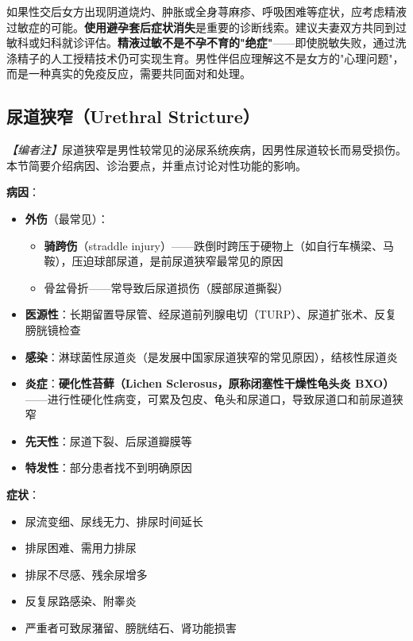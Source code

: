 \begin{enumerate}
\begin{tcolorbox}[colback=pink!5!white,colframe=red!50!black,title=贴心小叮咛]
如果性交后女方出现阴道烧灼、肿胀或全身荨麻疹、呼吸困难等症状，应考虑精液过敏症的可能。\textbf{使用避孕套后症状消失}是重要的诊断线索。建议夫妻双方共同到过敏科或妇科就诊评估。\textbf{精液过敏不是不孕不育的"绝症"}——即使脱敏失败，通过洗涤精子的人工授精技术仍可实现生育。男性伴侣应理解这不是女方的"心理问题"，而是一种真实的免疫反应，需要共同面对和处理。
\end{tcolorbox}

\subsection{尿道狭窄（Urethral Stricture）}
\label{subsec:urethral_stricture}

\noindent\textit{【编者注】}尿道狭窄是男性较常见的泌尿系统疾病，因男性尿道较长而易受损伤。本节简要介绍病因、诊治要点，并重点讨论对性功能的影响。

\vspace{0.5em}
\noindent\textbf{病因}：

\begin{itemize}[leftmargin=2cm]
	\item \textbf{外伤}（最常见）：
	\begin{itemize}
		\item \textbf{骑跨伤}（straddle injury）——跌倒时跨压于硬物上（如自行车横梁、马鞍），压迫球部尿道，是前尿道狭窄最常见的原因
		\item 骨盆骨折——常导致后尿道损伤（膜部尿道撕裂）
	\end{itemize}
	\item \textbf{医源性}：长期留置导尿管、经尿道前列腺电切（TURP）、尿道扩张术、反复膀胱镜检查
	\item \textbf{感染}：淋球菌性尿道炎（是发展中国家尿道狭窄的常见原因），结核性尿道炎
	\item \textbf{炎症}：\textbf{硬化性苔藓（Lichen Sclerosus，原称闭塞性干燥性龟头炎 BXO）}——进行性硬化性病变，可累及包皮、龟头和尿道口，导致尿道口和前尿道狭窄
	\item \textbf{先天性}：尿道下裂、后尿道瓣膜等
	\item \textbf{特发性}：部分患者找不到明确原因
\end{itemize}

\vspace{0.5em}
\noindent\textbf{症状}：
\begin{itemize}[leftmargin=2cm]
	\item 尿流变细、尿线无力、排尿时间延长
	\item 排尿困难、需用力排尿
	\item 排尿不尽感、残余尿增多
	\item 反复尿路感染、附睾炎
	\item 严重者可致尿潴留、膀胱结石、肾功能损害
\end{itemize}


\end{enumerate}
